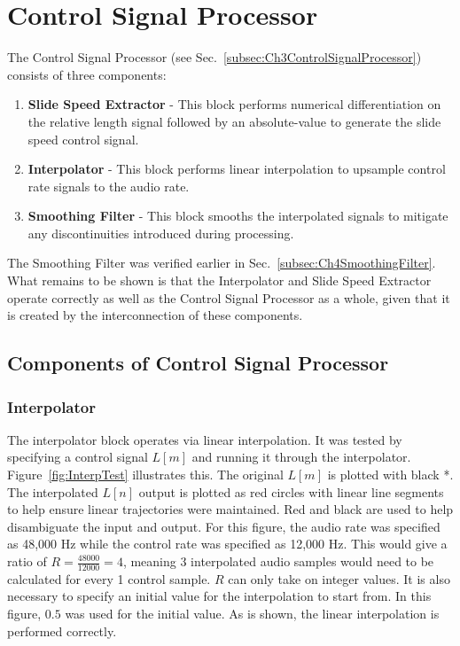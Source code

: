 \documentclass[../main.tex]{subfiles}
\begin{document}
\section{Control Signal Processor}
The Control Signal Processor (see Sec.~\ref{subsec:Ch3ControlSignalProcessor}) consists of three components:
\begin{enumerate}
    \item \textbf{Slide Speed Extractor} - This block performs numerical differentiation on the relative length signal followed by an absolute-value to generate the slide speed control signal.
    \item \textbf{Interpolator} - This block performs linear interpolation to upsample control rate signals to the audio rate.
    \item \textbf{Smoothing Filter} - This block smooths the interpolated signals to mitigate any discontinuities introduced during processing.
\end{enumerate}
The Smoothing Filter was verified earlier in Sec.~\ref{subsec:Ch4SmoothingFilter}. What remains to be shown is that the Interpolator and Slide Speed Extractor operate correctly as well as the Control Signal Processor as a whole, given that it is created by the interconnection of these components.

\subsection{Components of Control Signal Processor}
\subsubsection{Interpolator}
The interpolator block operates via linear interpolation.  It was tested by specifying a control signal $L[m]$ and running it through the interpolator. Figure~\ref{fig:InterpTest} illustrates this. The original $L[m]$ is plotted with black *. The interpolated $L[n]$ output is plotted as red circles with linear line segments to help ensure linear trajectories were maintained. Red and black are used to help disambiguate the input and output. For this figure, the audio rate was specified as 48,000 Hz while the control rate was specified as 12,000 Hz. This would give a ratio of $R = \frac{48000}{12000} = 4$, meaning 3 interpolated audio samples would need to be calculated for every 1 control sample. $R$ can only take on integer values. It is also necessary to specify an initial value for the interpolation to start from. In this figure, $0.5$ was used for the initial value. As is shown, the linear interpolation is performed correctly.
\end{document}
